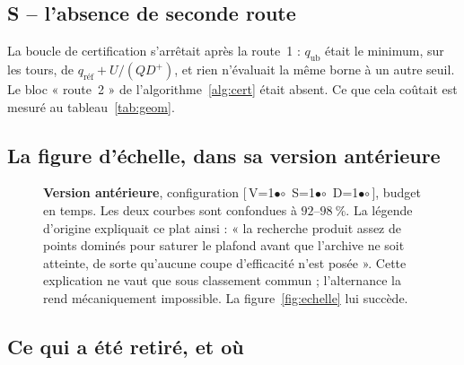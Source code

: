 \documentclass[11pt,a4paper]{article}
\theoremstyle{plain}
\theoremstyle{remark}
\newcommand{\cfgm}[1]{\ifnum#1=1$\bullet$\else$\circ$\fi}
\newcommand{\conf}[3]{%
  \textsf{\footnotesize[\,V\cfgm{#1}\ S\cfgm{#2}\ D\cfgm{#3}\,]}}
\begin{document}
\subsection{S -- l'absence de seconde route}

La boucle de certification s'arrêtait après la route~1 : $q_{\text{ub}}$
était le minimum, sur les tours, de $q_{\text{réf}}+U/(QD^{+})$, et rien
n'évaluait la même borne à un autre seuil. Le bloc « route~2 » de
l'algorithme~\ref{alg:cert} était absent. Ce que cela coûtait est mesuré
au tableau~\ref{tab:geom}.

\subsection{La figure d'échelle, dans sa version antérieure}

\begin{figure}[H]
\centering
{}
\caption{\textbf{Version antérieure}, configuration \conf{0}{0}{0}, budget
en temps. Les deux courbes sont confondues à $92$--$98\ \%$. La légende
d'origine expliquait ce plat ainsi : « la recherche produit assez de points
dominés pour saturer le plafond avant que l'archive ne soit atteinte, de
sorte qu'aucune coupe d'efficacité n'est posée ». Cette explication ne vaut
que sous classement commun ; l'alternance la rend mécaniquement impossible.
La figure~\ref{fig:echelle} lui succède.}
\label{fig:echelleold}
\end{figure}

\subsection{Ce qui a été retiré, et où}
\end{document}
